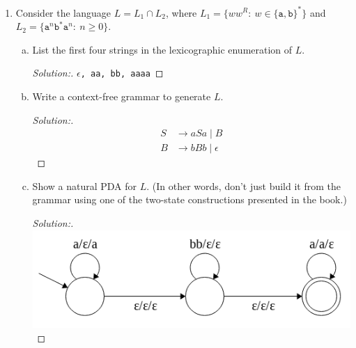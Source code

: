 \documentclass[10pt]{article}
\begin{document}
\begin{enumerate}[1)]
\begin{enumerate}[a)]
\item
Prove that $L$ is not regular.
\begin{proof}[Proof:]
If $L$ were regular, then $L^R$ would be regular.  If $L^R$ were regular, then $\lnot (L^R)$ would be regular.  If $\lnot (L^R)$ were regular, then $L' = \lnot (L^R)\ \cap\ a^*ba^*b$ would be regular. $L' = a^nba^nb$.  Let $w = a^kba^kb$.  Then $y$ must be $a^p$ for some $p \geq 1$, with $y$ in the first region of $a$'s.  Pumping out generates a new string $w' = a^{n-p}ba^nb$ which is not in $L'$.  So by the pumping theorem $L'$ is not regular. Therefore $L$ is not regular. 
\end{proof}
\end{enumerate}

\pagebreak

\item
Consider the language $L = L_1 \cap L_2$, where $L_1 = \{ww^R:\ w \in \{\texttt{a}, \texttt{b}\}^*\}$ and $L_2 = \{\texttt{a}^n\texttt{b}^*\texttt{a}^n:\ n \geq 0\}$.
\begin{enumerate}[a)]
\item
List the first four strings in the lexicographic enumeration of $L$.
\begin{proof}[Solution:]
\texttt{$\epsilon$, aa, bb, aaaa}
\end{proof}

\item
Write a context-free grammar to generate $L$.
\begin{proof}[Solution:]
\begin{align*}
S &\rightarrow aSa \mid B\\
B &\rightarrow bBb \mid \epsilon
\end{align*}
\end{proof}

\item
Show a natural PDA for $L$.  (In other words, don’t just build it from the grammar using one of the two-state constructions presented in the book.)
\begin{proof}[Solution:]$ $\\
\includegraphics[scale=.5]{images/solutions/3c.png}
\end{proof}


\end{enumerate}
\end{enumerate}
\end{document}
